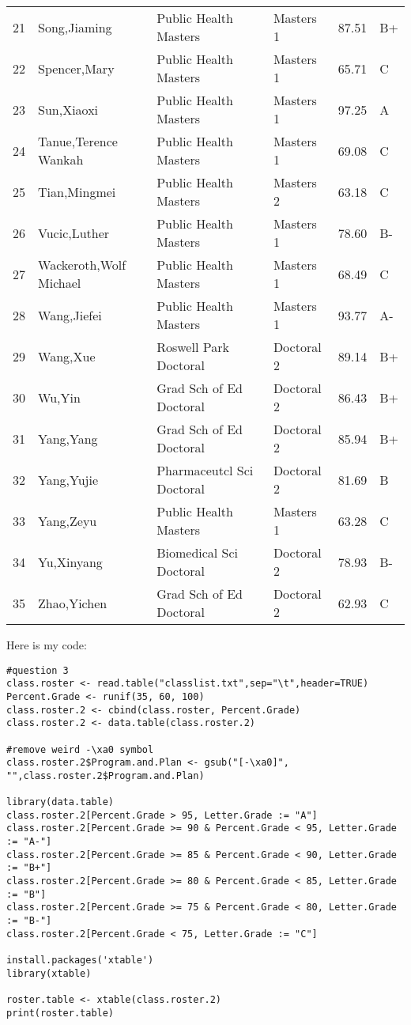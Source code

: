 \documentclass[letterpaper]{article}
\begin{document}
\begin{enumerate}
\begin{table}[ht]
\begin{tabular}{rlllrl}
  21 & Song,Jiaming & Public Health Masters  & Masters 1 & 87.51 & B+ \\ 
  22 & Spencer,Mary & Public Health Masters  & Masters 1 & 65.71 & C \\ 
  23 & Sun,Xiaoxi & Public Health Masters  & Masters 1 & 97.25 & A \\ 
  24 & Tanue,Terence Wankah & Public Health Masters  & Masters 1 & 69.08 & C \\ 
  25 & Tian,Mingmei & Public Health Masters  & Masters 2 & 63.18 & C \\ 
  26 & Vucic,Luther & Public Health Masters  & Masters 1 & 78.60 & B- \\ 
  27 & Wackeroth,Wolf Michael & Public Health Masters  & Masters 1 & 68.49 & C \\ 
  28 & Wang,Jiefei & Public Health Masters  & Masters 1 & 93.77 & A- \\ 
  29 & Wang,Xue & Roswell Park Doctoral  & Doctoral 2 & 89.14 & B+ \\ 
  30 & Wu,Yin & Grad Sch of Ed Doctoral  & Doctoral 2 & 86.43 & B+ \\ 
  31 & Yang,Yang & Grad Sch of Ed Doctoral  & Doctoral 2 & 85.94 & B+ \\ 
  32 & Yang,Yujie & Pharmaceutcl Sci Doctoral  & Doctoral 2 & 81.69 & B \\ 
  33 & Yang,Zeyu & Public Health Masters  & Masters 1 & 63.28 & C \\ 
  34 & Yu,Xinyang & Biomedical Sci Doctoral  & Doctoral 2 & 78.93 & B- \\ 
  35 & Zhao,Yichen & Grad Sch of Ed Doctoral  & Doctoral 2 & 62.93 & C \\ 
   \hline
\end{tabular}
\end{table}

Here is my code:
\begin{verbatim}
#question 3
class.roster <- read.table("classlist.txt",sep="\t",header=TRUE)
Percent.Grade <- runif(35, 60, 100)
class.roster.2 <- cbind(class.roster, Percent.Grade)
class.roster.2 <- data.table(class.roster.2)

#remove weird -\xa0 symbol
class.roster.2$Program.and.Plan <- gsub("[-\xa0]", "",class.roster.2$Program.and.Plan)

library(data.table)
class.roster.2[Percent.Grade > 95, Letter.Grade := "A"]
class.roster.2[Percent.Grade >= 90 & Percent.Grade < 95, Letter.Grade := "A-"]
class.roster.2[Percent.Grade >= 85 & Percent.Grade < 90, Letter.Grade := "B+"]
class.roster.2[Percent.Grade >= 80 & Percent.Grade < 85, Letter.Grade := "B"]
class.roster.2[Percent.Grade >= 75 & Percent.Grade < 80, Letter.Grade := "B-"]
class.roster.2[Percent.Grade < 75, Letter.Grade := "C"]

install.packages('xtable')
library(xtable)

roster.table <- xtable(class.roster.2)
print(roster.table)

\end{verbatim}

\end{enumerate}
\end{document}
